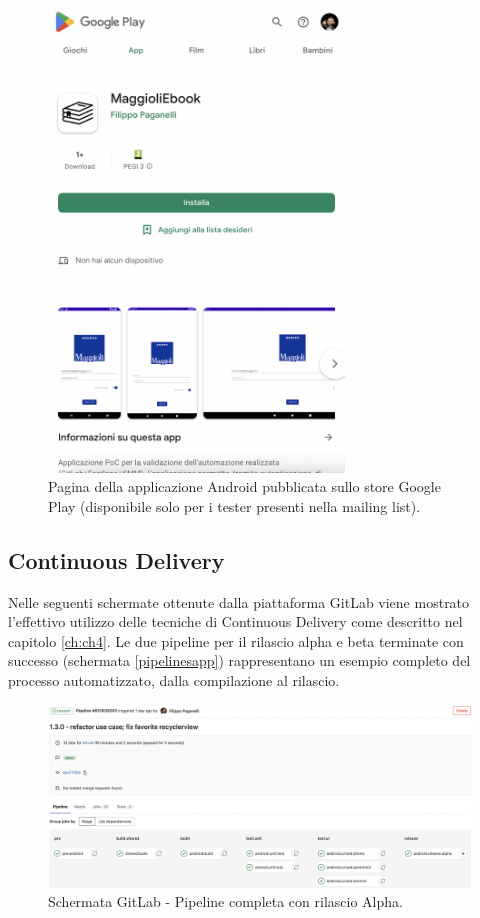 \begin{figure}[H]
\centering
    \includegraphics[width=0.7\textwidth]{img/Screenshot 2022-09-28 at 15.06.56.png}
    \caption{Pagina della applicazione Android pubblicata sullo store Google Play (disponibile solo per i tester presenti nella mailing list).}
    \label{playstoreapp}
\end{figure}

\subsection{Continuous Delivery}
Nelle seguenti schermate ottenute dalla piattaforma GitLab viene mostrato l'effettivo utilizzo delle tecniche di Continuous Delivery come descritto nel capitolo \ref{ch:ch4}. Le due pipeline per il rilascio alpha e beta terminate con successo (schermata \ref{pipelinesapp}) rappresentano un esempio completo del processo automatizzato, dalla compilazione al rilascio.

\begin{figure}[H]
\centering
    \includegraphics[width=1\textwidth]{img/Screenshot 2022-09-28 at 15.51.47.png}
    \caption{Schermata GitLab - Pipeline completa con rilascio Alpha.}
    \label{alpharelease}
\end{figure}

